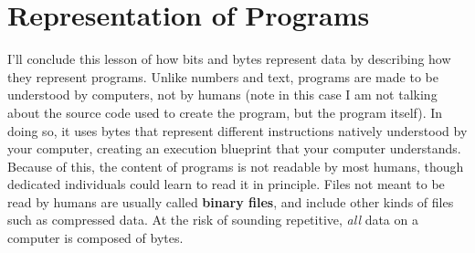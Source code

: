 \documentclass{article}
\begin{document}
\section*{Representation of Programs}
I'll conclude this lesson of how bits and bytes represent data by describing how they represent programs. Unlike
numbers and text, programs are made to be understood by computers, not by humans (note in this case I am not talking
about the source code used to create the program, but the program itself). In doing so, it uses bytes that represent
different instructions natively understood by your computer, creating an execution blueprint that your computer 
understands. Because of this, the content of programs is not readable by most humans, though dedicated individuals
could learn to read it in principle. Files not meant to be read by humans are usually called 
\textbf{binary files}, and include other kinds of files such as
compressed data. At the risk of sounding repetitive, \textit{all} data on a computer is composed of bytes.
\end{document}
